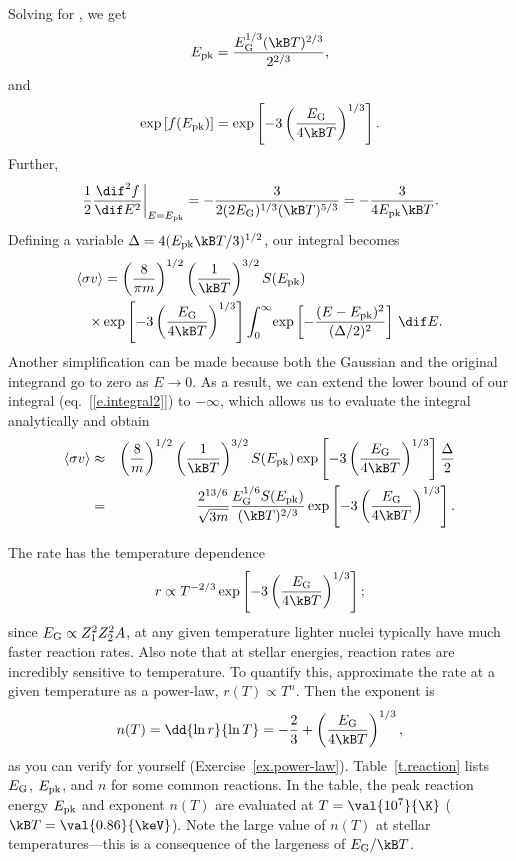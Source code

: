 \begin{sidebar}
Solving for \Epk, we get
\[
\Epk = \frac{\EG^{1/3}(\kB T)^{2/3}}{2^{2/3}},
\]
and 
\[ \exp\left[f(\Epk)\right] = \exp\left[-3\left(\frac{\EG}{4\kB T}\right)^{1/3}\right].
\]
Further,
\[
\left.\frac{1}{2}\frac{\dif^{2}f}{\dif E^{2}}\right|_{E=\Epk} = -\frac{3}{2(2\EG)^{1/3}(\kB T)^{5/3}} = -\frac{3}{4\Epk \kB T}.
\]
Defining a variable $\Delta = 4(\Epk \kB T/3)^{1/2}$, our integral becomes
\begin{eqnarray}\label{e.integral2}
\lefteqn{\langle\sigma v\rangle = \left(\frac{8}{\pi m}\right)^{1/2}\left(\frac{1}{\kB T}\right)^{3/2} S(\Epk)} \nonumber\\
&&\times 
  \exp\left[-3\left(\frac{\EG}{4\kB T}\right)^{1/3}\right]\int_{0}^{\infty}\!\exp\left[-\frac{(E-\Epk)^{2}}{(\Delta/2)^{2}}\right]\,\dif E.
\end{eqnarray}
Another simplification can be made because both the Gaussian and the original integrand go to zero as $E\to 0$.  As a result, we can extend the lower bound of our integral (eq.~[\ref{e.integral2}]) to $-\infty$, which allows us to evaluate the integral analytically and obtain
\begin{eqnarray}\label{e.rate2}
\langle\sigma v\rangle &\approx& \left(\frac{8}{m}\right)^{1/2}\left(\frac{1}{\kB T}\right)^{3/2} S(\Epk) \exp\left[-3\left(\frac{\EG}{4\kB T}\right)^{1/3}\right] \frac{\Delta}{2}\nonumber\\
 &=& \frac{2^{13/6}}{\sqrt{3m}}\frac{\EG^{1/6}S(\Epk)}{(\kB T)^{2/3}} \exp\left[-3\left(\frac{\EG}{4\kB T}\right)^{1/3}\right]  .
\end{eqnarray}
\end{sidebar}

The rate has the temperature dependence
\[
	r \propto T^{-2/3} \exp\left[-3\left(\frac{\EG}{4\kB T}\right)^{1/3}\right];
\]
since $E_{\mathrm{G}} \propto Z_{1}^{2}Z_{2}^{2}A$, at any given temperature lighter nuclei typically have much faster reaction rates. Also note that at stellar energies, reaction rates are incredibly sensitive to temperature. To quantify this, approximate the rate at a given temperature as a power-law, $r(T)\propto T^{n}$. Then the exponent is
\begin{equation}\label{e.exponent}
 n(T) = \dd{\ln r}{\ln T} = -\frac{2}{3} + \left(\frac{\EG}{4\kB T}\right)^{1/3},
\end{equation}
as you can verify for yourself (Exercise~\ref{ex.power-law}). Table~\ref{t.reaction} lists $E_{\mathrm{G}}$, $E_{\mathrm{pk}}$, and $n$ for some common reactions. 
In the table, the peak reaction energy $E_{\mathrm{pk}}$ and exponent $n(T)$ are evaluated at $T = \val{10^{7}}{\K}$ ($\kB T = \val{0.86}{\keV}$). Note the large value of $n(T)$ at stellar temperatures---this is a consequence of the largeness of $\EG/\kB T$.
 

